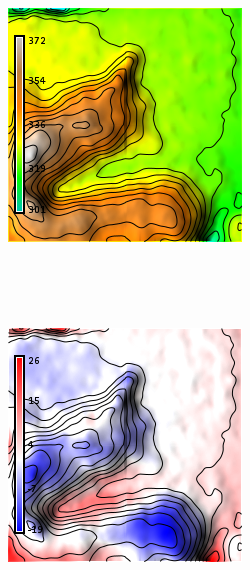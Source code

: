 \documentclass{sigchi}
\begin{document}
\begin{figure}
\begin{minipage}[t]{0.33\textwidth}
\begin{subfigure}{\linewidth}
            \includegraphics[width=\textwidth]{figures/magallanes/magallanes_dem_2.png}%
            \caption{}~\label{fig:dem_2}
        \end{subfigure}\\
        \begin{subfigure}{\linewidth}
            \centering
            \includegraphics[width=\textwidth]{figures/magallanes/magallanes_diff_2.png}%

\end{subfigure}
\end{minipage}
\end{figure}
\end{document}
